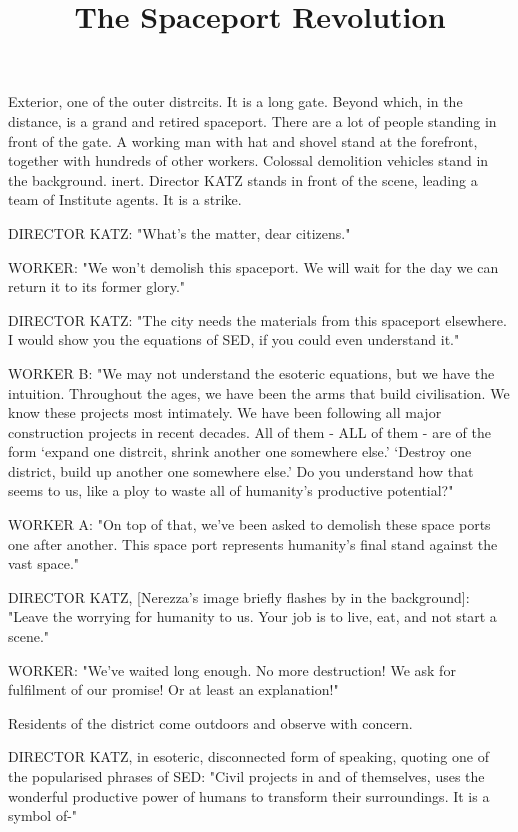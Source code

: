\documentclass[11pt]{article}
\begin{document}
\ttfamily
\title{The Spaceport Revolution}
\maketitle

Exterior, one of the outer distrcits. 
It is a long gate.
Beyond which, in the distance, is a grand and retired spaceport.
There are a lot of people standing in front of the gate.
A working man with hat and shovel stand at the forefront, together with hundreds of other workers. 
Colossal demolition vehicles stand in the background. inert.
Director KATZ stands in front of the scene, leading a team of Institute agents. 
It is a strike.

DIRECTOR KATZ: "What's the matter, dear citizens."

WORKER: "We won't demolish this spaceport.
We will wait for the day we can return it to its former glory."

DIRECTOR KATZ: "The city needs the materials from this spaceport elsewhere. 
I would show you the equations of SED, if you could even understand it."

WORKER B: "We may not understand the esoteric equations, but we have the intuition.
Throughout the ages, we have been the arms that build civilisation.
We know these projects most intimately.
We have been following all major construction projects in recent decades.
All of them - ALL of them - are of the form `expand one distrcit, shrink another one somewhere else.' 
`Destroy one district, build up another one somewhere else.'
Do you understand how that seems to us, like a ploy to waste all of humanity's productive potential?"

WORKER A: "On top of that, we've been asked to demolish these space ports one after another. 
This space port represents humanity's final stand against the vast space."

DIRECTOR KATZ, [Nerezza's image briefly flashes by in the background]: "Leave the worrying for humanity to us. 
Your job is to live, eat, and not start a scene."

WORKER: "We've waited long enough.
No more destruction! 
We ask for fulfilment of our promise!
Or at least an explanation!"

Residents of the district come outdoors and observe with concern.

DIRECTOR KATZ, in esoteric, disconnected form of speaking, quoting one of the popularised phrases of SED: "Civil projects in and of themselves, uses the wonderful productive power of humans to transform their surroundings. 
It is a symbol of-"
\end{document}
